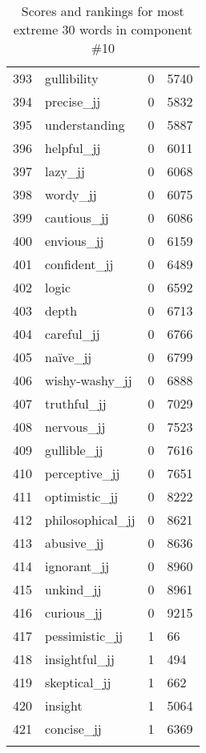 \begin{longtable}[!htbp]{| rlr@{.}l |}
    393 & gullibility & 0 & 5740 \\
    394 & precise\_jj & 0 & 5832 \\
    395 & understanding & 0 & 5887 \\
    396 & helpful\_jj & 0 & 6011 \\
    397 & lazy\_jj & 0 & 6068 \\
    398 & wordy\_jj & 0 & 6075 \\
    399 & cautious\_jj & 0 & 6086 \\
    400 & envious\_jj & 0 & 6159 \\
    401 & confident\_jj & 0 & 6489 \\
    402 & logic & 0 & 6592 \\
    403 & depth & 0 & 6713 \\
    404 & careful\_jj & 0 & 6766 \\
    405 & naïve\_jj & 0 & 6799 \\
    406 & wishy-washy\_jj & 0 & 6888 \\
    407 & truthful\_jj & 0 & 7029 \\
    408 & nervous\_jj & 0 & 7523 \\
    409 & gullible\_jj & 0 & 7616 \\
    410 & perceptive\_jj & 0 & 7651 \\
    411 & optimistic\_jj & 0 & 8222 \\
    412 & philosophical\_jj & 0 & 8621 \\
    413 & abusive\_jj & 0 & 8636 \\
    414 & ignorant\_jj & 0 & 8960 \\
    415 & unkind\_jj & 0 & 8961 \\
    416 & curious\_jj & 0 & 9215 \\
    417 & pessimistic\_jj & 1 & 66 \\
    418 & insightful\_jj & 1 & 494 \\
    419 & skeptical\_jj & 1 & 662 \\
    420 & insight & 1 & 5064 \\
    421 & concise\_jj & 1 & 6369 \\
    \hline
    \caption{Scores and rankings for most extreme 30 words in component \#10} \\
\end{longtable}
